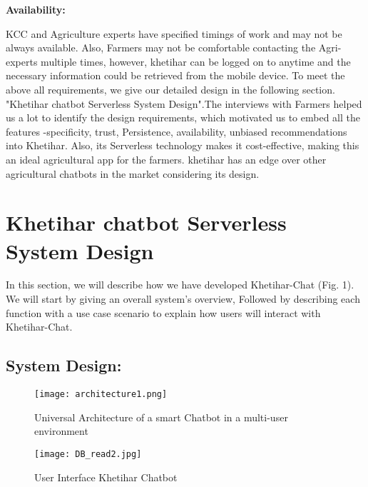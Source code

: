 \documentclass[10pt,conference]{IEEEtran}
\begin{document}
\textbf{Availability:}
{\raggedright
KCC and Agriculture experts have specified timings of work and may not be always available. Also, Farmers may not be comfortable contacting the Agri-experts multiple times, however, khetihar can be logged on to anytime and the  necessary information could be retrieved from the mobile device.\newline
To meet the above all requirements, we give our detailed design in the following section. "Khetihar chatbot Serverless System Design".The interviews with Farmers helped us a lot to identify the design requirements, which motivated us to embed all the features -specificity, trust, Persistence, availability, unbiased recommendations into Khetihar. Also, its Serverless technology makes it cost-effective, making this an ideal agricultural app for the farmers. khetihar has an edge over other agricultural chatbots in the market considering its design.
\newline
}


\section{Khetihar chatbot Serverless System Design}
In this section, we will describe how we have developed Khetihar-Chat (Fig. 1). We will start by giving an overall system’s overview, Followed by describing each function with a use case scenario to explain how users will interact with Khetihar-Chat.\newline
\subsection{System Design:}


\begin{figure}[h]
  \texttt{[image: architecture1.png]}
  \caption{Universal Architecture of a smart Chatbot in a multi-user environment  }
\end{figure}

\begin{figure}[h]
 \centering
  \texttt{[image: DB\_read2.jpg]}
  \caption{User Interface Khetihar Chatbot  }
\end{figure}
\end{document}

